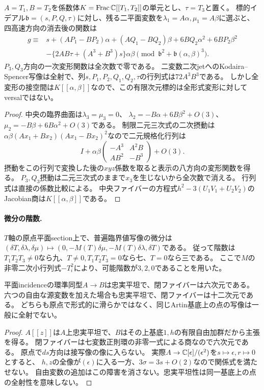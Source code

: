 \begin{proposition}[退化因子一般点の二次jet]
$A=T_1,B=T_2$を係数体$K=\operatorname{Frac}\mathbb C[[T_1,T_2]]$の単元とし、$\tau=T_3$と置く。
標的イデアル$\mathfrak b=(s,P,Q,\tau)$に対し、残る二平面変数を$\lambda_1=A\alpha,\mu_1=A\beta$に選ぶと、
四高速方向の消去後の関数は
\begin{align*}
 g\equiv{}&s+(AP_1-BP_2)\alpha+(AQ_1-BQ_2)\beta
 +6BQ_2\alpha^2+6BP_2\beta^2\\
 &-\{2AB\tau+(A^3+B^3)s\}\alpha\beta
 \pmod{\mathfrak b^2+\mathfrak b(\alpha,\beta)^3}.
\end{align*}
$P_3,Q_3$方向の一次変形関数は全次数で零である。
二変数二次jetへのKodaira--Spencer写像は全射で、列$s,P_1,P_2,Q_1,Q_2,\tau$の行列式は$72A^3B^3$である。
しかし全変形の接空間は$K[[\alpha,\beta]]$なので、この有限次元標的は全形式変形に対してversalではない。
\end{proposition}
\begin{proof}
中央の臨界曲面は$\lambda_3=\mu_3=0$、
$\lambda_2=-B\alpha+6B\beta^2+O(3)$、
$\mu_2=-B\beta+6B\alpha^2+O(3)$である。
制限二元三次式の二次摂動は
$\alpha\beta(Ax_1+Bx_2)(Ax_1-Bx_2)^2$なので二元規格化行列は
\[
 I+\alpha\beta\begin{pmatrix}-A^3&A^2B\\AB^2&-B^3\end{pmatrix}+O(3).
\]
摂動をこの行列で変換した後の$xyz$係数を取ると表示の八方向の変形関数を得る。
$P_3,Q_3$摂動は二元三次式のままで$x_3$を生じないから全次数で消える。
行列式は直接の係数比較による。
中央ファイバーの方程式$h^2-3(U_1V_1+U_2V_2)$のJacobian商は$K[[\alpha,\beta]]$である。
\end{proof}

\paragraph{微分の階数.}
$T$軸の原点平面section上で、普遍臨界値写像の微分は
$(\delta T,\delta\lambda,\delta\mu)\mapsto
(0,-M(T)\delta\mu,-M(T)\delta\lambda,\delta T)$である。
従って階数は$T_1T_2T_3\ne0$なら九、$T\ne0,T_1T_2T_3=0$なら七、$T=0$なら三である。
ここで$M$の非零二次小行列式$-T_i^2$により、可能階数が$3,2,0$であることを用いた。

\begin{corollary}[忠実平坦性とArtin点の持上げの相違]
平面incidenceの環準同型$A\to B$は忠実平坦で、閉ファイバーは六次元である。
六つの自由な源変数を加えた場合も忠実平坦で、閉ファイバーは十二次元である。
どちらも原点で形式的に滑らかではなく、同じArtin基底上の点の写像は一般に全射でない。
\end{corollary}
\begin{proof}
$A[[z]]$は$A$上忠実平坦で、$B$はその上基底$1,h$の有限自由加群だから主張を得る。
閉ファイバーは七変数正則環の非零一式による商なので六次元である。
原点で$ds$方向は接写像の像に入らない。
実際$A\to\mathbb C[\epsilon]/(\epsilon^2)$を$s\mapsto\epsilon,r\mapsto0$とすると、
$h,z$の全像が$(\epsilon)$に入る一方、$3\sigma=3s+O(2)$なので関係式を満たせない。
自由変数の追加はこの障害を消さない。忠実平坦性は同一基底上の点の全射性を意味しない。
\end{proof}

